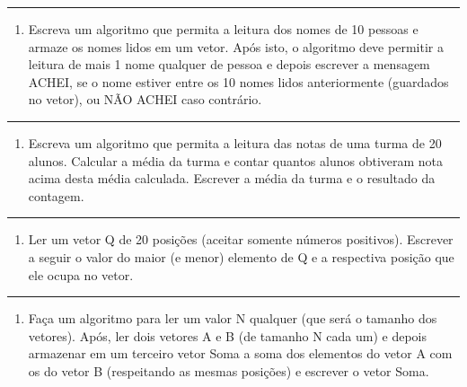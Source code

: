 \documentclass[12pt,a4paper]{article}
\providecommand{\tightlist}{%
      \setlength{\itemsep}{0pt}\setlength{\parskip}{0pt}}
\begin{document}
    \begin{center}\rule{0.5\linewidth}{0.5pt}\end{center}

\begin{enumerate}
\def\labelenumi{\arabic{enumi}.}
\setcounter{enumi}{4}
\tightlist
\item
  Escreva um algoritmo que permita a leitura dos nomes de 10 pessoas e
  armaze os nomes lidos em um vetor. Após isto, o algoritmo deve
  permitir a leitura de mais 1 nome qualquer de pessoa e depois escrever
  a mensagem ACHEI, se o nome estiver entre os 10 nomes lidos
  anteriormente (guardados no vetor), ou NÃO ACHEI caso contrário.
\end{enumerate}

    \begin{center}\rule{0.5\linewidth}{0.5pt}\end{center}

\begin{enumerate}
\def\labelenumi{\arabic{enumi}.}
\setcounter{enumi}{5}
\tightlist
\item
  Escreva um algoritmo que permita a leitura das notas de uma turma de
  20 alunos. Calcular a média da turma e contar quantos alunos obtiveram
  nota acima desta média calculada. Escrever a média da turma e o
  resultado da contagem.
\end{enumerate}

    \begin{center}\rule{0.5\linewidth}{0.5pt}\end{center}

\begin{enumerate}
\def\labelenumi{\arabic{enumi}.}
\setcounter{enumi}{6}
\tightlist
\item
  Ler um vetor Q de 20 posições (aceitar somente números positivos).
  Escrever a seguir o valor do maior (e menor) elemento de Q e a
  respectiva posição que ele ocupa no vetor.
\end{enumerate}

    \begin{center}\rule{0.5\linewidth}{0.5pt}\end{center}

\begin{enumerate}
\def\labelenumi{\arabic{enumi}.}
\setcounter{enumi}{7}
\tightlist
\item
  Faça um algoritmo para ler um valor N qualquer (que será o tamanho dos
  vetores). Após, ler dois vetores A e B (de tamanho N cada um) e depois
  armazenar em um terceiro vetor Soma a soma dos elementos do vetor A
  com os do vetor B (respeitando as mesmas posições) e escrever o vetor
  Soma.
\end{enumerate}
\end{document}
